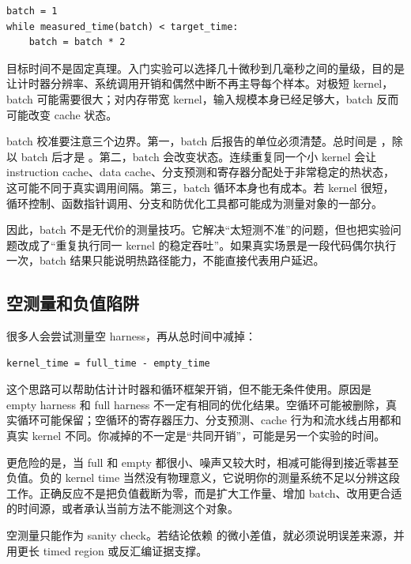 \begin{lstlisting}
batch = 1
while measured_time(batch) < target_time:
    batch = batch * 2
\end{lstlisting}

目标时间不是固定真理。入门实验可以选择几十微秒到几毫秒之间的量级，目的是让计时器分辨率、系统调用开销和偶然中断不再主导每个样本。对极短 kernel，batch 可能需要很大；对内存带宽 kernel，输入规模本身已经足够大，batch 反而可能改变 cache 状态。

batch 校准要注意三个边界。第一，batch 后报告的单位必须清楚。总时间是 ，除以 batch 后才是 。第二，batch 会改变状态。连续重复同一个小 kernel 会让 instruction cache、data cache、分支预测和寄存器分配处于非常稳定的热状态，这可能不同于真实调用间隔。第三，batch 循环本身也有成本。若 kernel 很短，循环控制、函数指针调用、分支和防优化工具都可能成为测量对象的一部分。

因此，batch 不是无代价的测量技巧。它解决“太短测不准”的问题，但也把实验问题改成了“重复执行同一 kernel 的稳定吞吐”。如果真实场景是一段代码偶尔执行一次，batch 结果只能说明热路径能力，不能直接代表用户延迟。

\subsection{空测量和负值陷阱}

很多人会尝试测量空 harness，再从总时间中减掉：

\begin{lstlisting}
kernel_time = full_time - empty_time
\end{lstlisting}

这个思路可以帮助估计计时器和循环框架开销，但不能无条件使用。原因是 empty harness 和 full harness 不一定有相同的优化结果。空循环可能被删除，真实循环可能保留；空循环的寄存器压力、分支预测、cache 行为和流水线占用都和真实 kernel 不同。你减掉的不一定是“共同开销”，可能是另一个实验的时间。

更危险的是，当 full 和 empty 都很小、噪声又较大时，相减可能得到接近零甚至负值。负的 kernel time 当然没有物理意义，它说明你的测量系统不足以分辨这段工作。正确反应不是把负值截断为零，而是扩大工作量、增加 batch、改用更合适的时间源，或者承认当前方法不能测这个对象。

\begin{warningbox}
空测量只能作为 sanity check。若结论依赖  的微小差值，就必须说明误差来源，并用更长 timed region 或反汇编证据支撑。
\end{warningbox}

